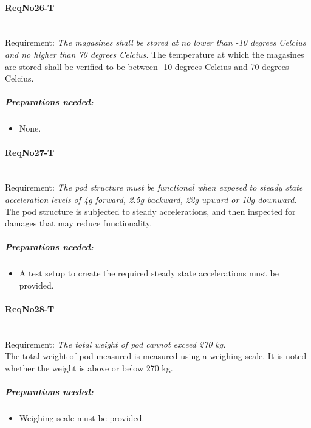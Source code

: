 \paragraph{ReqNo26-T}\mbox{}\\ %
Requirement: \textit{The magasines shall be stored at no lower than -10 degrees Celcius and no higher than 70 degrees Celcius.}
The temperature at which the magasines are stored shall be verified to be between -10 degrees Celcius and 70 degrees Celcius.

	\subparagraph{Preparations needed:}
	\begin{itemize}
	\item None.
	\end{itemize}

\paragraph{ReqNo27-T}\mbox{}\\ %
Requirement: \textit{The pod structure must be functional when exposed to steady state acceleration levels of 4g forward, 2.5g backward, 22g upward or 10g downward.}
\\
The pod structure is subjected to steady accelerations, and then inspected for damages that may reduce functionality.

\subparagraph{Preparations needed:}
	\begin{itemize}
	\item A test setup to create the required steady state accelerations must be provided.
	\end{itemize} 
	

\paragraph{ReqNo28-T}\mbox{}\\ %
Requirement: \textit{The total weight of pod cannot exceed 270 kg.}
\\
The total weight of pod measured is measured using a weighing scale. It is noted whether the weight is above or below 270 kg.
\\
	\subparagraph{Preparations needed:}
	\begin{itemize}
	\item Weighing scale must be provided.
	\end{itemize} 

